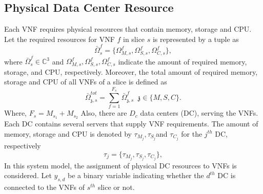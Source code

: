 \documentclass[conference]{IEEEtran}
\begin{document}
\subsection{Physical Data Center Resource}
Each VNF requires
physical resources that contain memory, storage and CPU.
Let the required resources for VNF $f$ in slice $s$ is represented by a tuple as
\begin{equation}
\bar{\Omega}_{s}^f = \{\Omega_{M,{s}}^f, \Omega_{S,{s}}^f, \Omega_{C,{s}}^f \},
\end{equation}
where $\bar{\Omega}_{s}^f\in \mathbb{C}^{3}$ and $\Omega_{M,{s}}^f, \Omega_{S,{s}}^f, \Omega_{C,{s}}^f$ indicate the amount of required memory, storage, and CPU, respectively.
Moreover, the total amount of required memory, storage and CPU of all VNFs of a slice is defined as
\begin{equation}
\textstyle \bar{\Omega}_{\mathfrak{z},s}^{tot} = \sum_{f=1}^{F_s}\bar{\Omega}_{\mathfrak{z},s}^f \;\; \mathfrak{z} \in \{M, S, C\}.
\end{equation}
Where, $F_s = M_{s_1} + M_{s_2}$
Also, there are $D_c$ data centers (DC), serving the VNFs. Each DC contains several servers that supply VNF requirements.
The amount of memory, storage and CPU is denoted by $\tau_{M_{j}}, \tau_{S_{j}}$and $\tau_{C_{j}} $ for the $j^{th}$ DC, respectively
\begin{equation*}
\tau_j = \{\tau_{M_{j}}, \tau_{S_{j}}, \tau_{C_{j}} \},
\end{equation*}
In this system model, the assignment of physical DC resources to VNFs is considered. Let $y_{s,d}$ be a binary variable indicating whether the $d^{th}$ DC is connected to the VNFs of $s^{th}$ slice or not.
\end{document}
